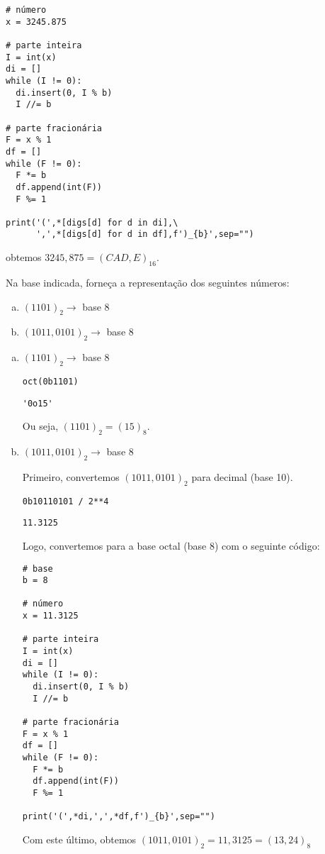 \begin{resol}
\begin{enumerate}[a)]
\begin{lstlisting}
# número
x = 3245.875

# parte inteira 
I = int(x)
di = []
while (I != 0):
  di.insert(0, I % b)
  I //= b

# parte fracionária
F = x % 1
df = []
while (F != 0):
  F *= b
  df.append(int(F))
  F %= 1

print('(',*[digs[d] for d in di],\
      ',',*[digs[d] for d in df],f')_{b}',sep="")      
\end{lstlisting}

\noindent obtemos $3245,875 = (CAD,E)_{16}$.      

  \end{enumerate}
\end{resol}

\begin{exeresol}
  Na base indicada, forneça a representação dos seguintes números:
  \begin{enumerate}[a)]
  \item $(1101)_2 \to$ base 8
  \item $(1011,0101)_2 \to$ base 8
  \end{enumerate}
\end{exeresol}
\begin{resol}
  \begin{enumerate}[a)]
  \item $(1101)_2 \to$ base 8

\begin{lstlisting}
oct(0b1101)
\end{lstlisting}

\begin{verbatim}
'0o15'
\end{verbatim}
    
Ou seja, $(1101)_2 = (15)_8$.
    
  \item $(1011,0101)_2 \to$ base 8

    Primeiro, convertemos $(1011,0101)_2$ para decimal (base 10).

\begin{lstlisting}
0b10110101 / 2**4
\end{lstlisting}

\begin{verbatim}
11.3125
\end{verbatim}
    
    Logo, convertemos para a base octal (base 8) com o seguinte código:

\begin{lstlisting}
# base
b = 8

# número
x = 11.3125

# parte inteira 
I = int(x)
di = []
while (I != 0):
  di.insert(0, I % b)
  I //= b

# parte fracionária
F = x % 1
df = []
while (F != 0):
  F *= b
  df.append(int(F))
  F %= 1

print('(',*di,',',*df,f')_{b}',sep="")      
\end{lstlisting}

Com este último, obtemos $(1011,0101)_2 = 11,3125 = (13,24)_8$
  \end{enumerate}  
\end{resol}

